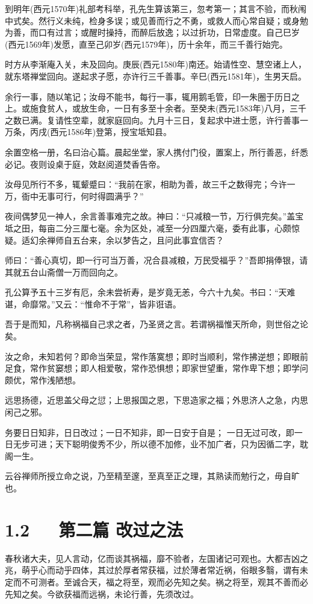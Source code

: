 \documentclass[letterpaper,10pt,english]{sphinxmanual}
\begin{document}
到明年(西元1570年)礼部考科举，孔先生算该第三，忽考第一；其言不验，而秋闱中式矣。然行义未纯，检身多误；或见善而行之不勇，或救人而心常自疑；或身勉为善，而口有过言；或醒时操持，而醉后放逸；以过折功，日常虚度。自己巳岁(西元1569年)发愿，直至己卯岁(西元1579年)，历十余年，而三千善行始完。

时方从李渐庵入关，未及回向。庚辰(西元1580年)南还。始请性空、慧空诸上人，就东塔禅堂回向。遂起求子愿，亦许行三千善事。辛巳(西元1581年)，生男天启。

余行一事，随以笔记；汝母不能书，每行一事，辄用鹅毛管，印一朱圈于历日之上。或施食贫人，或放生命，一日有多至十余者。至癸未(西元1583年)八月，三千之数已满。复请性空辈，就家庭回向。九月十三日，复起求中进士愿，许行善事一万条，丙戌(西元1586年)登第，授宝坻知县。

余置空格一册，名曰治心篇。晨起坐堂，家人携付门役，置案上，所行善恶，纤悉必记。夜则设桌于庭，效赵阅道焚香告帝。

汝母见所行不多，辄颦蹙曰：“我前在家，相助为善，故三千之数得完；今许一万，衙中无事可行，何时得圆满乎？”

夜间偶梦见一神人，余言善事难完之故。神曰：“只减粮一节，万行俱完矣。”盖宝坻之田，每亩二分三厘七毫。余为区处，减至一分四厘六毫，委有此事，心颇惊疑。适幻余禅师自五台来，余以梦告之，且问此事宜信否？

师曰：“善心真切，即一行可当万善，况合县减粮，万民受福乎？”吾即捐俸银，请其就五台山斋僧一万而回向之。

孔公算予五十三岁有厄，余未尝祈寿，是岁竟无恙，今六十九矣。书曰：“天难谌，命靡常。”又云：“惟命不于常”，皆非诳语。

吾于是而知，凡称祸福自己求之者，乃圣贤之言。若谓祸福惟天所命，则世俗之论矣。

汝之命，未知若何？即命当荣显，常作落寞想；即时当顺利，常作拂逆想；即眼前足食，常作贫窭想；即人相爱敬，常作恐惧想；即家世望重，常作卑下想；即学问颇优，常作浅陋想。

远思扬德，近思盖父母之愆；上思报国之恩，下思造家之福；外思济人之急，内思闲己之邪。

务要日日知非，日日改过；一日不知非，即一日安于自是； 一日无过可改，即一日无步可进；天下聪明俊秀不少，所以德不加修，业不加广者，只为因循二字，耽阁一生。

云谷禅师所授立命之说，乃至精至邃，至真至正之理，其熟读而勉行之，毋自旷也。


\section{1.2   第二篇 改过之法}
\label{\detokenize{p00_u5176_u5b83/_u8881_u4e86_u51e1-_u4e86_u51e1_u56db_u8bad:id4}}
春秋诸大夫，见人言动，亿而谈其祸福，靡不验者，左国诸记可观也。大都吉凶之兆，萌乎心而动乎四体，其过於厚者常获福，过於薄者常近祸，俗眼多翳，谓有未定而不可测者。至诚合天，福之将至，观而必先知之矣。祸之将至，观其不善而必先知之矣。今欲获福而远祸，未论行善，先须改过。
\end{document}
